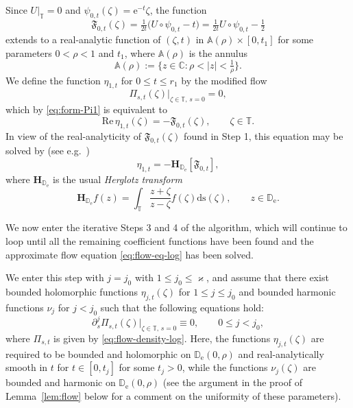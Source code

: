 \documentclass{amsart}
\newcommand{\be}{\begin{equation}}
\newcommand{\ee}{\end{equation}}
\newcommand{\C}{\mathbb{C}}
\newcommand{\D}{\mathbb{D}}
\newcommand{\T}{\mathbb{T}}
\newcommand{\A}{\mathbb{A}}
\newcommand{\diffs}{\mathrm{ds}}
\newcommand{\Hop}{\mathbf{H}}
\theoremstyle{definition}
\theoremstyle{remark}
\newcommand{\e}{\mathrm{e}}
\renewcommand{\Re}{\mathrm{Re}\,}
\numberwithin{equation}{subsection}
\begin{document}
Since $U\vert_{\T}=0$
and $\psi_{0,t}(\zeta)=\e^{-t}\zeta$,
the function
\be
\mathfrak{F}_{0,t}(\zeta)
=\tfrac{1}{2t}\big(U\circ\psi_{0,t}-t\big)=\tfrac{1}{2t}U\circ\psi_{0,t}-\tfrac12
\ee
extends to a real-analytic function of $(\zeta,t)$ 
in $\A(\rho)\times[0,t_1]$ for some
parameters $0<\rho<1$ and $t_1$,
where $\A(\rho)$ is the annulus
\be
\A(\rho):=\big\{z\in\C:\rho<|z|<\tfrac{1}{\rho}\big\}.
\ee
We define the function 
$\eta_{1,t}$ for $0\le t\le r_1$ by the modified flow
\be
\Pi_{s,t}(\zeta)\vert_{\zeta\in\T,\,s=0}= 0,
\ee
which by \eqref{eq:form-Pi1} is equivalent to
\be
\Re\eta_{1,t}(\zeta)=-\mathfrak{F}_{0,t}(\zeta),
\qquad \zeta\in\T.
\ee
In view of the real-analyticity of $\mathfrak{F}_{0,t}(\zeta)$
found in Step 1, this equation may be solved by
(see e.g.\ \cite[Subsection 2.5]{HW-ONP})
\be
\eta_{1,t}=-\Hop_{\D_\e}[\mathfrak{F}_{0,t}],
\ee 
where $\Hop_{\D_\e}$ is the usual {\em Herglotz transform}
\be\label{eq:Herglotz}
\Hop_{\D_\e}f(z)=\int_{\T}\frac{z+\zeta}{z-\zeta}f(\zeta)\diffs(\zeta),\qquad
z\in\D_\e.
\ee

We now enter the iterative
Steps 3 and 4 of the algorithm, which will continue to loop until all the remaining
coefficient functions have been found and the approximate flow equation
\eqref{eq:flow-eq-log} has been solved. 
\medskip

We enter this step with $j=j_0$ with $1\le j_0\le \varkappa$, and assume that
there exist bounded holomorphic functions
$\eta_{j,t}(\zeta)$ for $1\le j\le j_0$ and bounded harmonic
functions $\nu_j$ for $j<j_0$
such that the following equations hold:
\be
\partial_s^{j}\Pi_{s,t}(\zeta)\vert_{\zeta\in\T,\,s=0}\equiv 0,
\qquad 0\le j<j_0,
\ee
where $\Pi_{s,t}$ is given by \eqref{eq:flow-density-log}.
Here, the functions $\eta_{j,t}(\zeta)$ are required to be bounded and 
holomorphic on $\D_\e(0,\rho)$ and real-analytically smooth in 
$t$ for $t\in [0,t_j]$ for some $t_j>0$,
while the functions $\nu_j(\zeta)$ are bounded and harmonic on $\D_\e(0,\rho)$
(see the argument in the proof of Lemma~\ref{lem:flow} below
for a comment on the uniformity of these parameters). 
\end{document}
